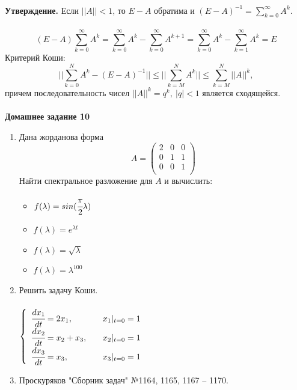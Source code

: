 \documentclass[12pt]{article}
\theoremstyle{definition}
\numberwithin{equation}{section}
\begin{document}
	\\
	\textbf{Утверждение.} Если $||A||<1$, то $E-A$ обратима и $(E-A)^{-1}=\sum\limits_{k=0}^{\infty}A^k$.\\
	\\
	$$(E-A)\sum\limits_{k=0}^{\infty}A^k=\sum\limits_{k=0}^{\infty}A^k-\sum\limits_{k=0}^{\infty}A^{k+1}=\sum\limits_{k=0}^{\infty}A^k-\sum\limits_{k=1}^{\infty}A^k=E$$
	Критерий Коши: $$||\sum\limits_{k=0}^N A^k-(E-A)^{-1}||\leqslant||\sum\limits_{k=M}^N A^k||\leqslant \sum\limits_{k=M}^N||A||^k,$$
	причем последовательность чисел $||A||^k=q^k,~|q|<1$ является сходящейся.\\ \\
	\textbf{Домашнее задание 10}\begin{enumerate}
		\item Дана жорданова форма 
		\[A = \begin{pmatrix}
		2 & 0 & 0\\
		0 & 1 & 1\\
		0 & 0 & 1\\
		\end{pmatrix}\]
		Найти спектральное разложение для $A$ и вычислить: 
		\begin{itemize}
			\item $f(\lambda)=sin(\cfrac{\pi}{2}\lambda)$
			\item $f(\lambda)=e^{\lambda t}$
			\item $f(\lambda)=\sqrt{\lambda}$
			\item $f(\lambda)=\lambda^{100}$
		\end{itemize}
		\item Решить задачу Коши.\\ \\
		$
		\left\{
		\begin{array}{lcl}
		\cfrac{dx_1}{dt}=2x_1, & & x_1|_{t=0}=1\\
		\cfrac{dx_2}{dt}=x_2+x_3, & & x_2|_{t=0}=1\\
		\cfrac{dx_3}{dt}=x_3, & & x_3|_{t=0}=1\\
		\end{array}
		\right.
		$
		\item Проскуряков "Сборник задач" №1164, 1165, 1167 -- 1170.
	\end{enumerate}
	~\\
\end{document}
